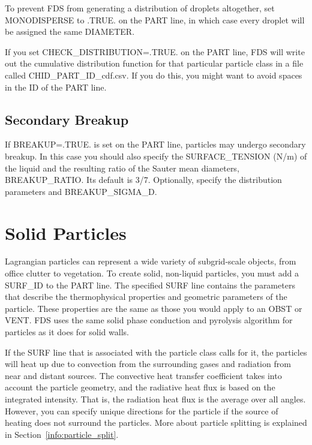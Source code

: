 \documentclass[11pt]{book}
\begin{document}
To prevent FDS from generating a distribution of droplets altogether, set {\ct MONODISPERSE} to {\ct .TRUE.} on the {\ct PART} line, in which case every droplet will be assigned the same {\ct DIAMETER}.

If you set {\ct CHECK\_DISTRIBUTION=.TRUE.} on the {\ct PART} line, FDS will write out the cumulative distribution function for that particular particle class in a file called {\ct CHID\_PART\_ID\_cdf.csv}. If you do this, you might want to avoid spaces in the {\ct ID} of the {\ct PART} line.




\subsection{Secondary Breakup}
\label{info:secondary_breakup}

If {\ct BREAKUP=.TRUE.} is set on the {\ct PART} line, particles may undergo secondary breakup.
In this case you should also specify the {\ct SURFACE\_TENSION} (N/m) of the liquid and the resulting ratio of the Sauter mean diameters,
{\ct BREAKUP\_RATIO}. Its default is 3/7. Optionally, specify the distribution parameters  and {\ct BREAKUP\_SIGMA\_D}.




\section{Solid Particles}
\label{info:PART_SURF}

Lagrangian particles can represent a wide variety of subgrid-scale objects, from office clutter to vegetation. To create solid, non-liquid particles, you must add a {\ct SURF\_ID} to the {\ct PART} line. The specified {\ct SURF} line contains the parameters that describe the thermophysical properties and geometric parameters of the particle. These properties are the same as those you would apply to an {\ct OBST} or {\ct VENT}. FDS uses the same solid phase conduction and pyrolysis algorithm for particles as it does for solid walls.

If the {\ct SURF} line that is associated with the particle class calls for it, the particles will heat up due to convection from the surrounding gases and radiation from near and distant sources. The convective heat transfer coefficient takes into account the particle geometry, and the radiative heat flux is based on the integrated intensity. That is, the radiation heat flux is the average over all angles. However, you can specify unique directions for the particle if the source of heating does not surround the particles. More about particle splitting is explained in Section~\ref{info:particle_split}.
\end{document}
